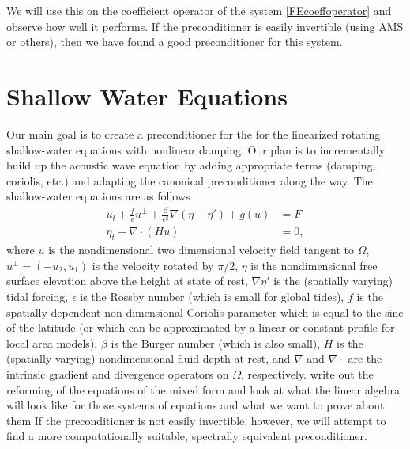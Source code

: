 \documentclass[11pt]{article}
\begin{document}
 We will use this on the coefficient operator of the system \eqref{FEcoeffoperator} and observe how well it performs. If the preconditioner is easily invertible (using AMS or others), then we have found a good preconditioner for this system.


\section{Shallow Water Equations}
 Our main goal is to create a preconditioner for the for the linearized rotating shallow-water equations with nonlinear damping. Our plan is to incrementally build up the acoustic wave equation by adding appropriate terms (damping, coriolis, etc.) and adapting the canonical preconditioner along the way. The shallow-water equations are as follows
\begin{equation}
\begin{split}
u_t + \frac{f}{\epsilon}u^{\perp}+\frac{\beta}{\epsilon^2}\nabla(\eta - \eta')+g(u) &= F\\
\eta_t + \nabla \cdot (Hu) &= 0,
\end{split}
\end{equation}
where $u$ is the nondimensional two dimensional velocity field tangent to $\Omega$, $u^\perp = (-u_2,u_1)$ is the velocity rotated by $\pi/2$, $\eta$ is the nondimensional free surface elevation above the height at state of rest, $\nabla\eta'$ is the (spatially varying) tidal forcing, $\epsilon$ is the Rossby number (which is small for global tides), $f$ is the spatially-dependent non-dimensional Coriolis parameter which is equal to the sine of the latitude (or which can be approximated by a linear or constant profile for local area models), $\beta$ is the Burger number (which is also small), $H$ is the (spatially varying) nondimensional fluid depth at rest, and $\nabla$ and $\nabla \cdot$ are the intrinsic gradient and divergence operators on $\Omega$, respectively.
write out the reforming of the equations of the mixed form
and look at what the linear algebra will look like for those systems of equations and what we want to prove about them
If the preconditioner is not easily invertible, however, we will attempt to find a more computationally suitable, spectrally equivalent preconditioner.
\end{document}
